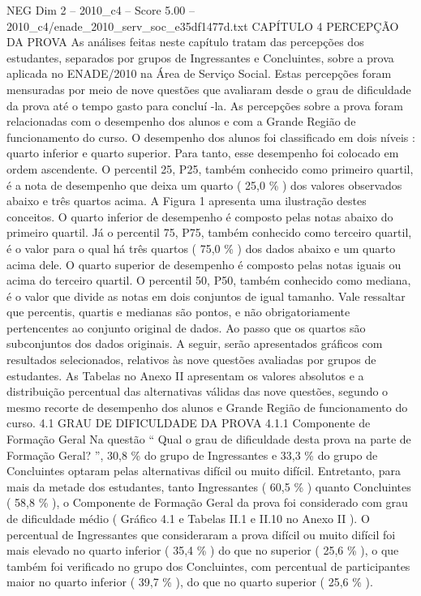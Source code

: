 \begin{textsample}{NEG Dim 2 – 2010\_c4 – Score 5.00 – 2010\_c4/enade\_2010\_serv\_soc\_e35df1477d.txt}  \label{ex:f2_neg_290}
CAPÍTULO 4 PERCEPÇÃO DA PROVA As análises feitas neste capítulo tratam das percepções dos estudantes, separados por grupos de Ingressantes e Concluintes, sobre a prova aplicada no ENADE/2010 na Área de Serviço Social.
Estas percepções foram mensuradas por meio de nove questões que avaliaram desde o grau de dificuldade da prova até o tempo gasto para concluí -la.
As percepções sobre a prova foram relacionadas com o desempenho dos alunos e com a Grande Região de funcionamento do curso.
O desempenho dos alunos foi classificado em dois níveis : quarto inferior e quarto superior.
Para tanto, esse desempenho foi colocado em ordem ascendente.
O percentil 25, P25, também conhecido como primeiro quartil, é a nota de desempenho que deixa um quarto ( 25,0 \% ) dos valores observados abaixo e três quartos acima.
A Figura 1 apresenta uma ilustração destes conceitos.
O quarto inferior de desempenho é composto pelas notas abaixo do primeiro quartil.
Já o percentil 75, P75, também conhecido como terceiro quartil, é o valor para o qual há três quartos ( 75,0 \% ) dos dados abaixo e um quarto acima dele.
O quarto superior de desempenho é composto pelas notas iguais ou acima do terceiro quartil.
O percentil 50, P50, também conhecido como mediana, é o valor que divide as notas em dois conjuntos de igual tamanho.
Vale ressaltar que percentis, quartis e medianas são pontos, e não obrigatoriamente pertencentes ao conjunto original de dados.
Ao passo que os quartos são subconjuntos dos dados originais.
A seguir, serão apresentados gráficos com resultados selecionados, relativos às nove questões avaliadas por grupos de estudantes.
As Tabelas no Anexo II apresentam os valores absolutos e a distribuição percentual das alternativas válidas das nove questões, segundo o mesmo recorte de desempenho dos alunos e Grande Região de funcionamento do curso. 4.1 GRAU DE DIFICULDADE DA PROVA 4.1.1 Componente de Formação Geral Na questão “ Qual o grau de dificuldade desta prova na parte de Formação Geral? ”, 30,8 \% do grupo de Ingressantes e 33,3 \% do grupo de Concluintes optaram pelas alternativas difícil ou muito difícil.
Entretanto, para mais da metade dos estudantes, tanto Ingressantes ( 60,5 \% ) quanto Concluintes ( 58,8 \% ), o Componente de Formação Geral da prova foi considerado com grau de dificuldade médio ( Gráfico 4.1 e Tabelas II.1 e II.10 no Anexo II ).
O percentual de Ingressantes que consideraram a prova difícil ou muito difícil foi mais elevado no quarto inferior ( 35,4 \% ) do que no superior ( 25,6 \% ), o que também foi verificado no grupo dos Concluintes, com percentual de participantes maior no quarto inferior ( 39,7 \% ), do que no quarto superior ( 25,6 \% ).

\end{textsample}

